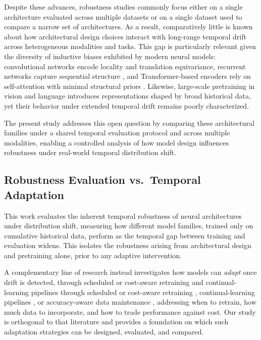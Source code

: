 Despite these advances, robustness studies commonly focus either on a single architecture evaluated across multiple datasets or on a single dataset used to compare a narrow set of architectures. As a result, comparatively little is known about how architectural design choices interact with long-range temporal drift across heterogeneous modalities and tasks. This gap is particularly relevant given the diversity of inductive biases exhibited by modern neural models: convolutional networks encode locality and translation equivariance, recurrent networks capture sequential structure \cite{hochreiter1997long,cho2014learning}, and Transformer-based encoders rely on self-attention with minimal structural priors \cite{vaswani2017attention}. Likewise, large-scale pretraining in vision and language \cite{devlin2019bert,liu2019roberta} introduces representations shaped by broad historical data, yet their behavior under extended temporal drift remains poorly characterized.

The present study addresses this open question by comparing these architectural families under a shared temporal evaluation protocol and across multiple modalities, enabling a controlled analysis of how model design influences robustness under real-world temporal distribution shift.

\subsection{Robustness Evaluation vs.\ Temporal Adaptation}

This work evaluates the inherent temporal robustness of neural architectures under distribution shift, measuring how different model families, trained only on cumulative historical data, perform as the temporal gap between training and evaluation widens. This isolates the robustness arising from architectural design and pretraining alone, prior to any adaptive intervention.

A complementary line of research instead investigates how models can \emph{adapt} once drift is detected, \iflncs through scheduled or cost-aware retraining \cite{mahadevan_cost_aware_2024} and continual-learning pipelines \cite{boether_modyn_2025}\else through scheduled or cost-aware retraining \cite{mahadevan_cost_effective_2023,mahadevan_cost_aware_2024}, continual-learning pipelines \cite{tian_continuum_2018,boether_modyn_2025,holzinger2024analysis}, or accuracy-aware data maintenance \cite{ralf2023wooders}\fi, addressing when to retrain, how much data to incorporate, and how to trade performance against cost. Our study is orthogonal to that literature and provides a foundation on which such adaptation strategies can be designed, evaluated, and compared.
